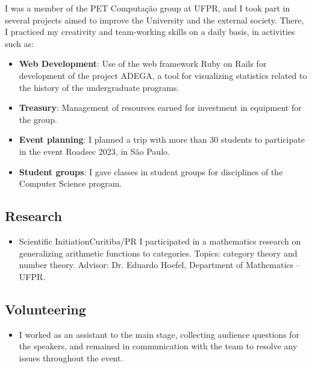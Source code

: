 \documentclass[a4paper, 12pt]{moderncv}
\begin{document}
\vspace{3pt}
I was a member of the PET Computação group at UFPR, and I took part in several
projects aimed to improve the University and the external society. There, I
practiced my creativity and team-working skills on a daily basis, in activities
such as:
\vspace{4pt}
\begin{itemize}
    \item{\textbf{Web Development}: Use of the web framework Ruby on Rails for
          development of the project ADEGA, a tool for visualizing statistics
          related to the history of the undergraduate programs.}
    \item{\textbf{Treasury}: Management of resources earned for investment in
          equipment for the group.}
    \item{\textbf{Event planning}: I planned a trip with more than 30 students
          to participate in the event Roadsec 2023, in São Paulo.}
    \item{\textbf{Student groups}: I gave classes in student groups for
          disciplines of the Computer Science program.}
\end{itemize}

\vspace{4pt}
\subsection{\small{Research}}
\begin{itemize}
    \item{
        {Scientific Initiation}{Curitiba/PR}{}
        {I participated in a mathematics research on generalizing arithmetic functions
        to categories. Topics: category theory and number theory. Advisor: Dr. Eduardo
        Hoefel, Department of Mathematics -- UFPR.}}
\end{itemize}

\vspace{4pt}
\subsection{\small{Volunteering}}
\begin{itemize}
    \item{
            {\vspace{3pt}I worked as an assistant to the main stage, collecting
            audience questions for the speakers, and remained in communication
            with the team to resolve any issues throughout the event.}}
        \vspace{4pt}
\end{itemize}
\vspace{4pt}
\end{document}
